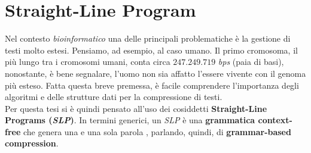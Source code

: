 \section{Straight-Line Program}
\label{slpsec}
Nel contesto \textit{bioinformatico} una delle principali problematiche è la
gestione di testi molto estesi. Pensiamo, ad esempio, al caso umano. Il primo
cromosoma, il più lungo tra i cromosomi umani, conta circa $247.249.719$
\textit{bps} (paia di basi), nonostante, è bene segnalare, l'uomo
non sia affatto l'essere vivente con il genoma più esteso. Fatta questa breve
premessa, è facile comprendere l'importanza degli algoritmi e delle strutture
dati per la compressione di testi.\\
Per questa tesi si è quindi pensato all'uso dei cosiddetti \textbf{Straight-Line
  Programs (\textit{SLP})}. In termini 
generici, un \textit{SLP} è una \textbf{grammatica context-free} che 
genera una e una sola parola \cite{slpsurvey}, parlando, quindi, di
\textbf{grammar-based compression}.
